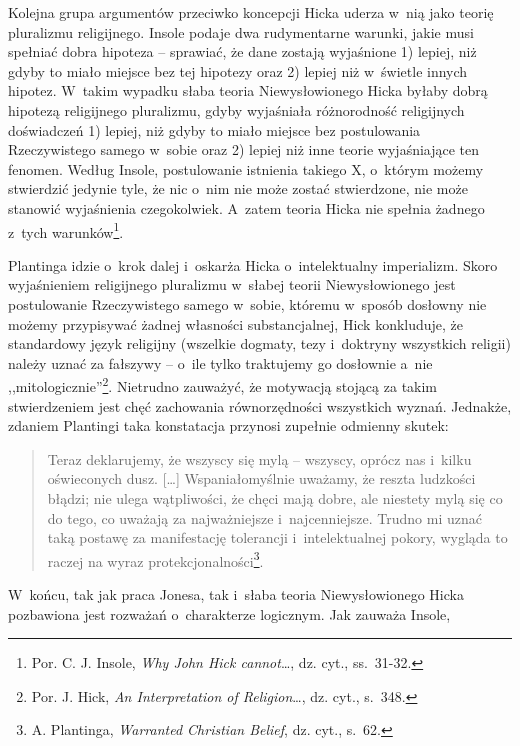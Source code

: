 Kolejna grupa argumentów przeciwko koncepcji Hicka uderza w~nią jako teorię pluralizmu religijnego. Insole podaje dwa rudymentarne warunki, jakie musi spełniać dobra hipoteza -- sprawiać, że dane zostają wyjaśnione 1) lepiej, niż gdyby to miało miejsce bez tej hipotezy oraz 2) lepiej niż w~świetle innych hipotez. W~takim wypadku słaba teoria Niewysłowionego Hicka byłaby dobrą hipotezą religijnego pluralizmu, gdyby wyjaśniała różnorodność religijnych doświadczeń 1) lepiej, niż gdyby to miało miejsce bez postulowania Rzeczywistego samego w~sobie oraz 2) lepiej niż inne teorie wyjaśniające ten fenomen. Według Insole, postulowanie istnienia takiego X, o~którym możemy stwierdzić jedynie tyle, że nic o~nim nie może zostać stwierdzone, nie może stanowić wyjaśnienia czegokolwiek. A~zatem teoria Hicka nie spełnia żadnego z~tych warunków\footnote{Por. C. J. Insole, \textit{Why John Hick cannot}\ldots, dz. cyt., ss.~31-32.}.

Plantinga idzie o~krok dalej i~oskarża Hicka o~intelektualny imperializm. Skoro wyjaśnieniem religijnego pluralizmu w~słabej teorii Niewysłowionego jest postulowanie Rzeczywistego samego w~sobie, któremu w~sposób dosłowny nie możemy przypisywać żadnej własności substancjalnej, Hick konkluduje, że standardowy język religijny (wszelkie dogmaty, tezy i~doktryny wszystkich religii) należy uznać za fałszywy -- o~ile tylko traktujemy go dosłownie a~nie ,,mitologicznie''\footnote{Por. J. Hick, \textit{An Interpretation of Religion}\ldots, dz. cyt., s.~348.}. Nietrudno zauważyć, że motywacją stojącą za takim stwierdzeniem jest chęć zachowania równorzędności wszystkich wyznań. Jednakże, zdaniem Plantingi taka konstatacja przynosi zupełnie odmienny skutek:

\begin{quote}
Teraz deklarujemy, że wszyscy się mylą -- wszyscy, oprócz nas i~kilku oświeconych dusz. [\ldots] Wspaniałomyślnie uważamy, że reszta ludzkości błądzi; nie ulega wątpliwości, że chęci mają dobre, ale niestety mylą się co do tego, co uważają za najważniejsze i~najcenniejsze. Trudno mi uznać taką postawę za manifestację tolerancji i~intelektualnej pokory, wygląda to raczej na wyraz protekcjonalności\footnote{A. Plantinga, \textit{Warranted Christian Belief}, dz. cyt., s.~62.}.
\end{quote}

W~końcu, tak jak praca Jonesa, tak i~słaba teoria Niewysłowionego Hicka pozbawiona jest rozważań o~charakterze logicznym. Jak zauważa Insole,

